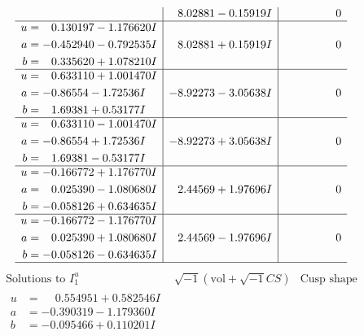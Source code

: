 \documentclass[1p]{elsarticle_modified}
\theoremstyle{definition}
\newcommand{\I}{\sqrt{-1}}
\begin{document}
$$\begin{array}{c|c|c}
 & \phantom{-}8.02881 - 0.15919 I & \phantom{-0.000000 } 0 \\ \hline\begin{aligned}
u &= \phantom{-}0.130197 - 1.176620 I \\
a &= -0.452940 - 0.792535 I \\
b &= \phantom{-}0.335620 + 1.078210 I\end{aligned}
 & \phantom{-}8.02881 + 0.15919 I & \phantom{-0.000000 } 0 \\ \hline\begin{aligned}
u &= \phantom{-}0.633110 + 1.001470 I \\
a &= -0.86554 - 1.72536 I \\
b &= \phantom{-}1.69381 + 0.53177 I\end{aligned}
 & -8.92273 - 3.05638 I & \phantom{-0.000000 } 0 \\ \hline\begin{aligned}
u &= \phantom{-}0.633110 - 1.001470 I \\
a &= -0.86554 + 1.72536 I \\
b &= \phantom{-}1.69381 - 0.53177 I\end{aligned}
 & -8.92273 + 3.05638 I & \phantom{-0.000000 } 0 \\ \hline\begin{aligned}
u &= -0.166772 + 1.176770 I \\
a &= \phantom{-}0.025390 - 1.080680 I \\
b &= -0.058126 + 0.634635 I\end{aligned}
 & \phantom{-}2.44569 + 1.97696 I & \phantom{-0.000000 } 0 \\ \hline\begin{aligned}
u &= -0.166772 - 1.176770 I \\
a &= \phantom{-}0.025390 + 1.080680 I \\
b &= -0.058126 - 0.634635 I\end{aligned}
 & \phantom{-}2.44569 - 1.97696 I & \phantom{-0.000000 } 0\\
 \hline 
 \end{array}$$\newpage$$\begin{array}{c|c|c}  
\text{Solutions to }I^u_{1}& \I (\text{vol} + \sqrt{-1}CS) & \text{Cusp shape}\\
 \hline 
\begin{aligned}
u &= \phantom{-}0.554951 + 0.582546 I \\
a &= -0.390319 - 1.179360 I \\
b &= -0.095466 + 0.110201 I\end{aligned}

\end{array}$$
\end{document}
